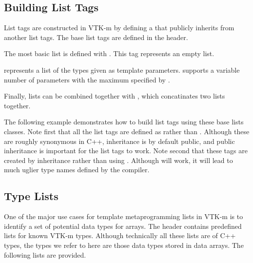 \subsection{Building List Tags}
\label{sec:BuildingListTags}

List tags are constructed in VTK-m by defining a  that
publicly inherits from another list tags. The base list tags are defined in
the  header.

The most basic list is defined with . This tag
represents an empty list.

 represents a list of the types given as
template parameters.  supports a variable number of
parameters with the maximum specified by .

Finally, lists can be combined together with
, which concatinates two lists
together.

The following example demonstrates how to build list tags using these base
lists classes. Note first that all the list tags are defined as
 rather than . Although these are roughly
synonymous in C++,  inheritance is by default public, and
public inheritance is important for the list tags to work. Note second that
these tags are created by inheritance rather than using
. Although  will work, it will lead to
much uglier type names defined by the compiler.


\subsection{Type Lists}
\label{sec:TypeLists}


One of the major use cases for template metaprogramming lists in VTK-m is
to identify a set of potential data types for arrays. The
 header contains predefined lists for known
VTK-m types. Although technically all these lists are of C++ types, the
types we refer to here are those data types stored in data arrays. The
following lists are provided.

